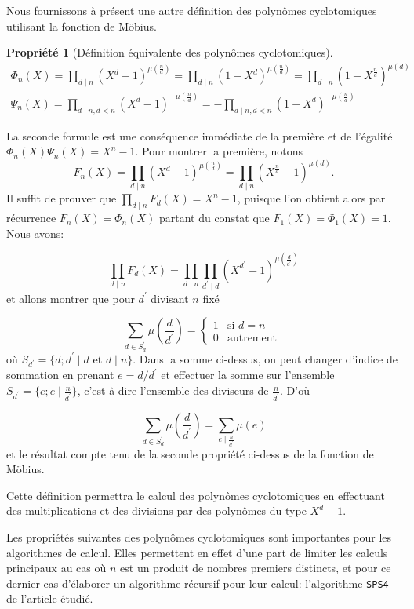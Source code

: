 \documentclass{article}
\theoremstyle{break}                  %
\newtheorem{propriete}{Propriété}
\begin{document}
Nous fournissons à présent une autre définition des polynômes cyclotomiques utilisant la fonction de Möbius.

\begin{propriete}[Définition équivalente des polynômes cyclotomiques]
	\begin{align}		
		\Phi_n(X) = \prod_{d \mid n} (X^d - 1)^{\mu(\frac{n}{d})} = \prod_{d \mid n} (1 - X^d)^{\mu(\frac{n}{d})} = \prod_{d \mid n} (1 - X^\frac{n}{d})^{\mu(d)} \tag{2.4}\label{mobphi}\\
		\Psi_n(X) = \prod_{d \mid n, d<n} (X^d - 1)^{-\mu(\frac{n}{d})} = -\prod_{d \mid n, d<n} (1 - X^d)^{-\mu(\frac{n}{d})}\tag{2.5}\label{mobpsi}
	\end{align}
\end{propriete}

La seconde formule est une conséquence immédiate de la première et de l'égalité $\Phi_n(X) \Psi_n(X) = X^n-1$. Pour montrer la première, notons
$$F_n(X) = \prod_{d \mid n} (X^d - 1)^{\mu(\frac{n}{d})} = \prod_{d \mid n} (X^{\frac{n}{d}} - 1)^{\mu(d)}.$$ Il suffit de prouver que $\displaystyle \prod_{ d \mid n} F_d(X) = X^n-1$, puisque l'on obtient alors par récurrence $F_n(X) = \Phi_n(X)$ partant du constat que $F_1(X) = \Phi_1(X) = 1$. Nous avons:

$$\prod_{ d \mid n} F_d(X) = \prod_{ d \mid n} \prod_{d^\prime \mid d} (X^{d^\prime} - 1)^{\mu(\frac{d}{d^\prime})}$$ et allons montrer que pour $d^\prime$ divisant $n$ fixé

$$\sum_{d \in S_d^\prime} \mu\left(\frac{d}{d^\prime}\right)=\begin{cases}1 &\text{si } d= n\\
	0 &\text{autrement }\end{cases}$$ où $S_{d^\prime} = \{d ; d^\prime \mid d \text{ et } d \mid n\}$.
Dans la somme ci-dessus, on peut changer d'indice de sommation en prenant $e = d/d^\prime$ et effectuer la somme sur l'ensemble $\overline{S}_{d^\prime} = \{e ; e \mid \frac{n}{d^\prime}\}$, c'est à dire l'ensemble des diviseurs de $\frac{n}{d^\prime}$. D'où

$$\sum_{d \in S_d^\prime} \mu\left(\frac{d}{d^\prime}\right) = \sum_{e \mid \frac{n}{d^\prime}} \mu(e)$$ et le résultat compte tenu de la seconde propriété ci-dessus de la fonction de Möbius.

Cette définition permettra le calcul des polynômes cyclotomiques en effectuant des multiplications et des divisions par des polynômes du type $X^d - 1$.

Les propriétés suivantes des polynômes cyclotomiques sont importantes pour les algorithmes de calcul. Elles permettent en effet d'une part de limiter les calculs principaux au cas où $n$ est un produit de nombres premiers distincts, et pour ce dernier cas d'élaborer un algorithme récursif pour leur calcul: l'algorithme \texttt{SPS4} de l'article étudié.
\end{document}
